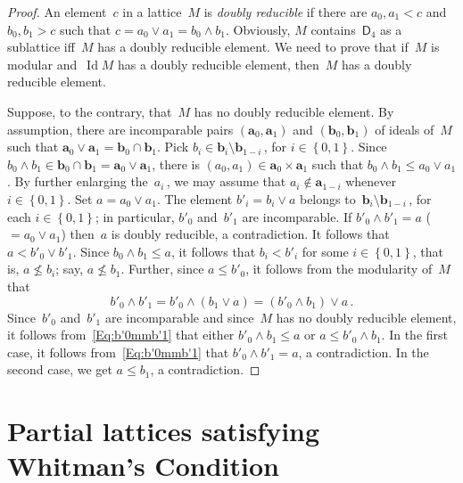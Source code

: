\documentclass[reqno]{amsart}
\numberwithin{equation}{section}
\theoremstyle{plain}
\theoremstyle{definition}
\theoremstyle{remark}
\numberwithin{figure}{section}
\numberwithin{table}{section}
\begin{document}
\begin{proof}
An element~$c$ in a lattice~$M$ is \emph{doubly reducible} if there are $a_0,a_1<c$ and $b_0,b_1>c$ such that $c=a_0\vee a_1=b_0\wedge b_1$.
Obviously, $M$ contains~${\mathsf{D}_{4}}$ as a sublattice if{f}~$M$ has a doubly reducible element.
We need to prove that if~$M$ is modular and~$\operatorname{Id} M$ has a doubly reducible element, then~$M$ has a doubly reducible element.

Suppose, to the contrary, that~$M$ has no doubly reducible element.
By assumption, there are incomparable pairs $({\boldsymbol{a}}_0,{\boldsymbol{a}}_1)$ and $({\boldsymbol{b}}_0,{\boldsymbol{b}}_1)$ of ideals of~$M$ such that ${\boldsymbol{a}}_0\vee{\boldsymbol{a}}_1={\boldsymbol{b}}_0\cap{\boldsymbol{b}}_1$.
Pick $b_i\in{\boldsymbol{b}}_i\setminus{\boldsymbol{b}}_{1-i}$\,, for $i\in{\left\{{0,1}\right\}}$.
Since $b_0\wedge b_1\in{\boldsymbol{b}}_0\cap{\boldsymbol{b}}_1={\boldsymbol{a}}_0\vee{\boldsymbol{a}}_1$, there is $(a_0,a_1)\in{\boldsymbol{a}}_0\times{\boldsymbol{a}}_1$ such that $b_0\wedge b_1\leq a_0\vee a_1$.
By further enlarging the~$a_i$\,, we may assume that $a_i\notin{\boldsymbol{a}}_{1-i}$ whenever $i\in{\left\{{0,1}\right\}}$.
Set $a=a_0\vee a_1$.
The element $b'_i=b_i\vee a$ belongs to~${\boldsymbol{b}}_i\setminus{\boldsymbol{b}}_{1-i}$\,, for each $i\in{\left\{{0,1}\right\}}$;
in particular, $b'_0$ and~$b'_1$ are incomparable.
If $b'_0\wedge b'_1=a$ ($=a_0\vee a_1$) then~$a$ is doubly reducible, a contradiction.
It follows that $a<b'_0\vee b'_1$.
Since $b_0\wedge b_1\leq a$, it follows that $b_i<b'_i$ for some $i\in{\left\{{0,1}\right\}}$, that is, $a\nleq b_i$; say, $a\nleq b_1$.
Further, since $a\leq b'_0$, it follows from the modularity of~$M$ that
 \begin{equation}\label{Eq:b'0mmb'1}
 b'_0\wedge b'_1=b'_0\wedge(b_1\vee a)=(b'_0\wedge b_1)\vee a\,.
 \end{equation}
Since~$b'_0$ and~$b'_1$ are incomparable and since~$M$ has no doubly reducible element, it follows from~\eqref{Eq:b'0mmb'1} that either $b'_0\wedge b_1\leq a$ or $a\leq b'_0\wedge b_1$.
In the first case, it follows from~\eqref{Eq:b'0mmb'1} that $b'_0\wedge b'_1=a$, a contradiction.
In the second case, we get $a\leq b_1$, a contradiction.
\end{proof}

\section{Partial lattices satisfying Whitman's Condition}\label{S:DavSands}
\end{document}
